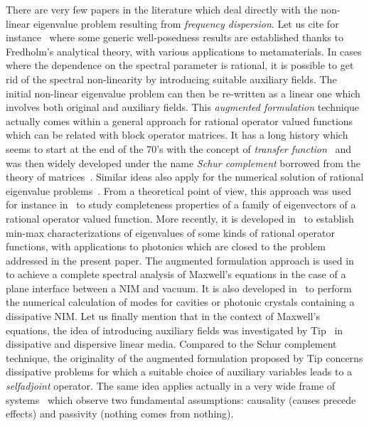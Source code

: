 There are very few papers in the literature which deal directly with the non-linear eigenvalue problem resulting from \emph{frequency dispersion}. Let us cite for instance~\cite{Coc-Maz-Mou-12} where some generic well-posedness results are established thanks to Fredholm's analytical theory, with various applications to metamaterials. In cases where the dependence on the spectral parameter is rational, it is possible to get rid of the spectral non-linearity by introducing suitable auxiliary fields. The initial non-linear eigenvalue problem can then be re-written as a linear one which involves both original and auxiliary fields. This \emph{augmented formulation} technique actually comes within a general approach for rational operator valued functions which can be related with block operator matrices. It has a long history which seems to start at the end of the 70's with the concept of \emph{transfer function}~\cite{Bar-Goh-Kaa-79} and was then widely developed under the name \emph{Schur complement} borrowed from the theory of matrices~\cite{Nag-89,Tre-08}. Similar ideas also apply for the numerical solution of rational eigenvalue problems~\cite{Gut-Tis-17,Su-Bai-11}. From a theoretical point of view, this approach was used for instance in~\cite{Ada-Lan-95} to study completeness properties of a family of eigenvectors of a rational operator valued function. More recently, it is developed in~\cite{Eng-Lan-Tre-17} to establish min-max characterizations of eigenvalues of some kinds of rational operator functions, with applications to photonics which are closed to the problem addressed in the present paper. The augmented formulation approach is used in~\cite{Cas-Haz-Jol} to achieve a complete spectral analysis of Maxwell's equations in the case of a plane interface between a NIM and vacuum. It is also developed in~\cite{Bru-Gra-Dem-16} to perform the numerical calculation of modes for cavities or photonic crystals containing a dissipative NIM. Let us finally mention that in the context of Maxwell's equations, the idea of introducing auxiliary fields was investigated by Tip~\cite{Tip-98} in dissipative and dispersive linear media. Compared to the Schur complement technique, the originality of the augmented formulation proposed by Tip concerns dissipative problems for which a suitable choice of auxiliary variables leads to a \emph{selfadjoint} operator. The same idea applies actually in a very wide frame of systems~\cite{Fig-Sch-07} which observe two fundamental assumptions: causality (causes precede effects) and passivity (nothing comes from nothing).



